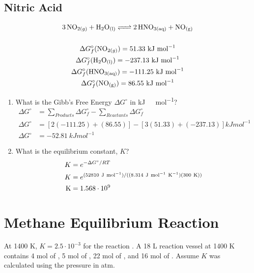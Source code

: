 \documentclass{article}
\begin{document}
\subsection{Nitric Acid}
\begin{gather*}
    \ce{3NO_{2(g)} + H_{2}O_{(l)} <=> 2HNO_{3(aq)} + NO_{(g)}}\\\\
    \Delta G^{\circ}_{f}(\ce{NO_{2(g)}}) = 51.33\ \si{kJ\ mol^{-1}}\\
    \Delta G^{\circ}_{f}(\ce{H_{2}O_{(l)}}) = -237.13\ \si{kJ\ mol^{-1}}\\
    \Delta G^{\circ}_{f}(\ce{HNO_{3(aq)}}) = -111.25\ \si{kJ\ mol^{-1}}\\
    \Delta G^{\circ}_{f}(\ce{NO_{(g)}}) = 86.55\ \si{kJ\ mol^{-1}}
\end{gather*}

\begin{enumerate}
    \item What is the Gibb's Free Energy $\Delta G^{\circ}$ in \si{kJ\
        mol^{-1}}?
    \begin{align*}
        \Delta G^{\circ}&=\sum\limits_{Products}\Delta G^{\circ}_{f} -
        \sum\limits_{Reactants} \Delta G^{\circ}_{f}\\
        \Delta G^{\circ}&=\left[2(-111.25)+(86.55)\right]-
        \left[3(51.33)+(-237.13)\right]\si{kJ mol^{-1}}\\
        \Delta G^{\circ}&=-52.81\ \si{kJ mol^{-1}}
    \end{align*}
    \item What is the equilibrium constant, $K$?
    \begin{align*}
        K &= e^{-\Delta G^{\circ}/RT}\\
        K &= e^{(52810\ \si{J\ mol^{-1}})/((8.314\ \si{J\ mol^{-1}\
K^{-1}})(300\ \si{K}))}\\
        \ce{K} &= 1.568\cdot 10^{9}
    \end{align*}
\end{enumerate}

\section{Methane Equilibrium Reaction}

At 1400 \si{K}, $K= 2.5\cdot10^{-3}$ for the reaction . A 18 \si{L} reaction vessel at 1400
\si{K} contains 4 \si{mol} of \ce{CH_{4}}, 5 \si{mol} of \ce{CS_{2}}, 22
\si{mol} of \ce{H_{2}}, and 16 \si{mol} of \ce{H_{2}S}. Assume $K$ was
calculated using the pressure in \si{atm}.
\end{document}
